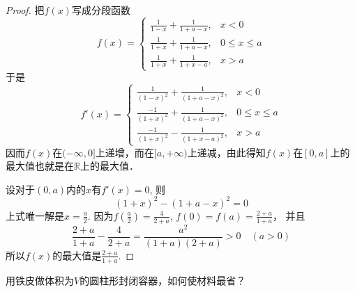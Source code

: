 \begin{proof}
把$f(x)$写成分段函数
\[f(x)=\begin{cases}
    \frac{1}{1-x}+\frac{1}{1+a-x}, & x<0\\
    \frac{1}{1+x}+\frac{1}{1+a-x}, & 0\le x\le a\\
    \frac{1}{1+x}+\frac{1}{1+x-a}, & x>a
\end{cases}\]
于是
\[f'(x)=\begin{cases}
    \frac{1}{(1-x)^2}+\frac{1}{(1+a-x)^2}, & x<0\\
    \frac{-1}{(1+x)^2}+\frac{1}{(1+a-x)^2}, & 0\le x\le a\\
    \frac{-1}{(1+x)^2}-\frac{1}{(1+x-a)^2}, & x>a
\end{cases}\]
因而$f(x)$在$(-\infty, 0]$上递增，而在$[a,+\infty)$上递减，由此得知$f(x)$在$[0,a]$上的最大值也就是在$\mathbb{R}$上的最大值．

设对于$(0,a)$内的$x$有$f'(x)=0$, 则
\[(1+x)^2- (1+a-x)^2=0\]
上式唯一解是$x=\frac{a}{2}$. 
因为$f\left(\frac{a}{2}\right)=\frac{4}{2+a}$, $f(0)=f(a)=\frac{2+a}{1+a}$，
并且
\[\frac{2+a}{1+a}-\frac{4}{2+a}= \frac{a^2}{(1+a)(2+a)}>0\quad  (a>0)\]
所以$f(x)$的最大值是$\frac{2+a}{1+a}$.
\end{proof}

\begin{example}
    用铁皮做体积为$V$的圆柱形封闭容器，如何使材料最省？
\end{example}


